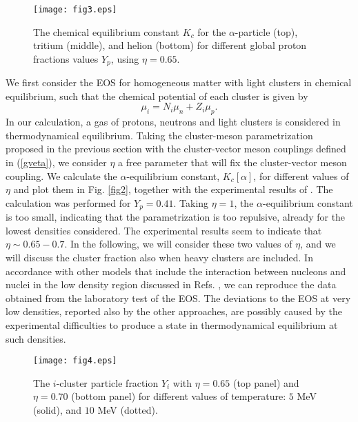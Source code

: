 \documentclass[aps,prc,nofootinbib,twocolumn,showpacs]{revtex4-1}
\begin{document}
\begin{figure}[thb]
     \texttt{[image: fig3.eps]}
    \caption{The chemical equilibrium constant $K_c$ for the $\alpha$-particle (top), tritium (middle), and helion (bottom) for different global proton fractions values $Y_p$, using
    $\eta=0.65$. }
\label{fig3}
\end{figure}

We first consider the EOS for  homogeneous matter with light clusters
in chemical equilibrium, such that the chemical potential of each cluster
is given by 
$$\mu_i=N_i\mu_n+Z_i\mu_p.$$
In our calculation, a gas of protons, neutrons and light clusters is
considered in thermodynamical equilibrium.
Taking the cluster-meson parametrization proposed in the previous
section with the cluster-vector meson couplings defined in
(\ref{gveta}), we  consider $\eta$ a free parameter that will 
fix the cluster-vector meson coupling.  
We calculate the $\alpha$-equilibrium constant, $K_c[\alpha]$, for different values of
$\eta$ and plot them in Fig. \ref{fig2}, together with the
experimental results of \cite{qin12}. The calculation was performed
for $Y_p=0.41$. Taking $\eta=1$, the $\alpha$-equilibrium constant is
too small, indicating that the
parametrization is too repulsive, already for the lowest densities
considered. The experimental results seem to indicate that $\eta\sim
0.65 - 0.7$. In the following, we will consider these two values of $\eta$,
and we will discuss the cluster fraction also when heavy clusters are
included. In accordance with other models that include the interaction
between nucleons and nuclei in the low density region discussed in Refs. \cite{qin12,hempel2015},
we can reproduce the data obtained from the laboratory test of the EOS.
The deviations to the EOS at very low densities, reported also by the other approaches,
are possibly caused by the experimental difficulties to produce a state in thermodynamical
equilibrium at such densities. 


\begin{figure}[!htbp]
    \texttt{[image: fig4.eps]}\\
    \caption{The $i$-cluster particle fraction $Y_i$ with $\eta=0.65$
      (top panel) and  $\eta=0.70$ (bottom panel)
    for different values of temperature: $5$ MeV (solid), and $10$ MeV (dotted).}
\label{fig4}
\end{figure}
\end{document}
